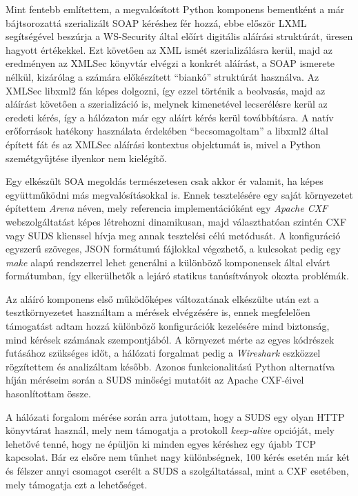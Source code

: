 Mint fentebb említettem, a megvalósított Python komponens bementként a már bájtsorozattá szerializált SOAP kéréshez fér hozzá, ebbe először LXML segítségével beszúrja a WS\hyp{}Security által előírt digitális aláírási struktúrát, üresen hagyott értékekkel. Ezt követően az XML ismét szerializálásra kerül, majd az eredményen az XMLSec könyvtár elvégzi a konkrét aláírást, a SOAP ismerete nélkül, kizárólag a számára előkészített ``biankó'' struktúrát használva. Az XMLSec libxml2 fán képes dolgozni, így ezzel történik a beolvasás, majd az aláírást követően a szerializáció is, melynek kimenetével lecserélésre kerül az eredeti kérés, így a hálózaton már egy aláírt kérés kerül továbbításra. A natív erőforrások hatékony használata érdekében ``becsomagoltam'' a libxml2 által épített fát és az XMLSec aláírási kontextus objektumát is, mivel a Python szemétgyűjtése ilyenkor nem kielégítő.

\bigskip

Egy elkészült SOA megoldás természetesen csak akkor ér valamit, ha képes együttműködni más megvalósításokkal is. Ennek tesztelésére egy saját környezetet építettem \emph{Arena} néven, mely referencia implementációként egy \emph{Apache CXF} webszolgáltatást képes létrehozni dinamikusan, majd választhatóan szintén CXF vagy SUDS klienssel hívja meg annak tesztelési célú metódusát. A konfiguráció egyszerű szöveges, JSON formátumú fájlokkal végezhető, a kulcsokat pedig egy \emph{make} alapú rendszerrel lehet generálni a különböző komponensek által elvárt formátumban, így elkerülhetők a lejáró statikus tanúsítványok okozta problémák.

Az aláíró komponens első működőképes változatának elkészülte után ezt a tesztkörnyezetet használtam a mérések elvégzésére is, ennek megfelelően támogatást adtam hozzá különböző konfigurációk kezelésére mind biztonság, mind kérések számának szempontjából. A környezet mérte az egyes kódrészek futásához szükséges időt, a hálózati forgalmat pedig a \emph{Wireshark} eszközzel rögzítettem és analizáltam később. Azonos funkcionalitású Python alternatíva híján méréseim során a SUDS minőségi mutatóit az Apache CXF-éivel hasonlítottam össze.

A hálózati forgalom mérése során arra jutottam, hogy a SUDS egy olyan HTTP könyvtárat használ, mely nem támogatja a protokoll \emph{keep-alive} opcióját, mely lehetővé tenné, hogy ne épüljön ki minden egyes kéréshez egy újabb TCP kapcsolat. Bár ez elsőre nem tűnhet nagy különbségnek, 100 kérés esetén már két és félszer annyi csomagot cserélt a SUDS a szolgáltatással, mint a CXF esetében, mely támogatja ezt a lehetőséget.


